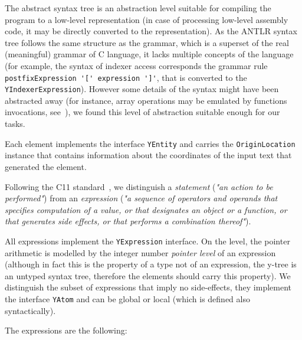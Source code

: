 The abstract syntax tree \ytree{} is an abstraction level suitable for compiling the program to a low-level representation (in case of processing low-level assembly code, it may be directly converted to the \xgraph{} representation).
As the ANTLR syntax tree follows the same structure as the grammar, which is a superset of the real (meaningful) grammar of C language, it lacks multiple concepts of the language (for example, the syntax of indexer access corresponds the grammar rule \lstinline{postfixExpression '[' expression ']'}, that is converted to the \texttt{YIndexerExpression}).
However some details of the syntax might have been abstracted away (for instance, array operations may be emulated by functions invocations, see~\cite[Chapter 5]{gries2012science}), we found this level of abstraction suitable enough for our tasks.

Each \ytree{} element implements the interface \texttt{YEntity} and carries the \texttt{OriginLocation} %
instance that contains information about the coordinates of the input text that generated the \ytree{} element.

Following the C11 standard~\cite{iso2012iec}, we distinguish a \textit{statement} (\textit{"an action to be performed"}) from an \textit{expression} (\textit{"a sequence of operators and operands that specifies computation of a value, or that designates an object or a function, or that generates side effects, or that performs a combination thereof"}).

All \ytree{} expressions implement the \texttt{YExpression} interface.
On the \ytree{} level, the pointer arithmetic is modelled by the integer number \textit{pointer level} of an expression (although in fact this is the property of a type not of an expression, the y-tree is an untyped syntax tree, therefore the elements \ytree{} should carry this property).
We distinguish the subset of expressions that imply no side-effects, they implement the interface \texttt{YAtom} and can be global or local (which is defined also syntactically).

\vspace{0.5em}
The \ytree{} expressions are the following:

